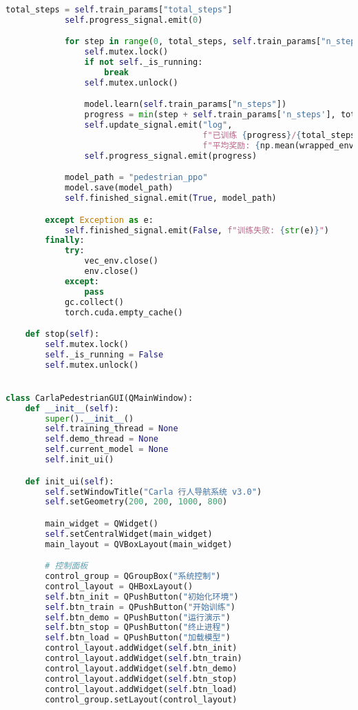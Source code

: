 \begin{lstlisting}[language=Python]
            total_steps = self.train_params["total_steps"]
            self.progress_signal.emit(0)

            for step in range(0, total_steps, self.train_params["n_steps"]):
                self.mutex.lock()
                if not self._is_running:
                    break
                self.mutex.unlock()

                model.learn(self.train_params["n_steps"])
                progress = min(step + self.train_params['n_steps'], total_steps)
                self.update_signal.emit("log",
                                        f"已训练 {progress}/{total_steps} 步 | "
                                        f"平均奖励: {np.mean(wrapped_env.episode_rewards[-10:]) if wrapped_env.episode_rewards else 0:.1f}")
                self.progress_signal.emit(progress)

            model_path = "pedestrian_ppo"
            model.save(model_path)
            self.finished_signal.emit(True, model_path)

        except Exception as e:
            self.finished_signal.emit(False, f"训练失败: {str(e)}")
        finally:
            try:
                vec_env.close()
                env.close()
            except:
                pass
            gc.collect()
            torch.cuda.empty_cache()

    def stop(self):
        self.mutex.lock()
        self._is_running = False
        self.mutex.unlock()


class CarlaPedestrianGUI(QMainWindow):
    def __init__(self):
        super().__init__()
        self.training_thread = None
        self.demo_thread = None
        self.current_model = None
        self.init_ui()

    def init_ui(self):
        self.setWindowTitle("Carla 行人导航系统 v3.0")
        self.setGeometry(200, 200, 1000, 800)

        main_widget = QWidget()
        self.setCentralWidget(main_widget)
        main_layout = QVBoxLayout(main_widget)

        # 控制面板
        control_group = QGroupBox("系统控制")
        control_layout = QHBoxLayout()
        self.btn_init = QPushButton("初始化环境")
        self.btn_train = QPushButton("开始训练")
        self.btn_demo = QPushButton("运行演示")
        self.btn_stop = QPushButton("终止进程")
        self.btn_load = QPushButton("加载模型")
        control_layout.addWidget(self.btn_init)
        control_layout.addWidget(self.btn_train)
        control_layout.addWidget(self.btn_demo)
        control_layout.addWidget(self.btn_stop)
        control_layout.addWidget(self.btn_load)
        control_group.setLayout(control_layout)


\end{lstlisting}
